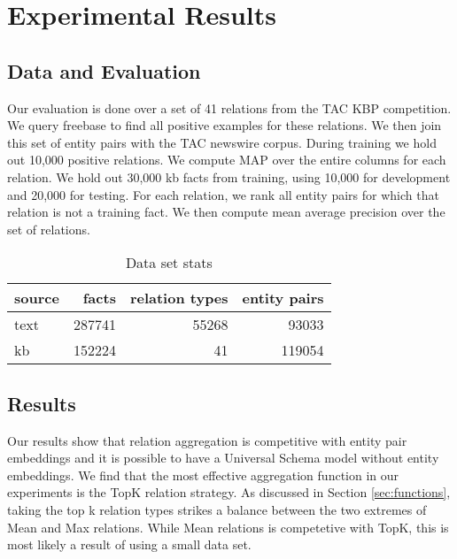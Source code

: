 \section{Experimental Results\label{sec:results}}

\subsection{Data and Evaluation}

Our evaluation is done over a set of 41 relations from the TAC KBP competition.
We query freebase to find all positive examples for these relations.
We then join this set of entity pairs with the TAC newswire corpus.
During training we hold out 10,000 positive relations.
We compute MAP over the entire columns for each relation.
We hold out 30,000 kb facts from training, using 10,000 for development and 20,000 for testing.
For each relation, we rank all entity pairs for which that relation is not a training fact.
We then compute mean average precision over the set of relations.


\begin{table}[h!]
\setlength{\tabcolsep}{4.1pt}
\begin{center}
\begin{tabular}{|l|r|r|r|}
\hline
\bf source & facts & relation types & entity pairs \\
\hline\hline
text & 287741 & 55268 & 93033  \\
\hline
kb & 152224 & 41 & 119054 \\
\hline

\hline
\end{tabular}
\caption{Data set stats
\label{data stats}}
\end{center}
\vspace{-.3cm}
\end{table}


\subsection {Results}
Our results show that relation aggregation is competitive with entity pair embeddings and it is possible to have a Universal Schema model without entity embeddings.
We find that the most effective aggregation function in our experiments is the TopK relation strategy.
As discussed in Section \ref{sec:functions}, taking the top k relation types strikes a balance between the two extremes of Mean and Max relations.
While Mean relations is competetive with TopK, this is most likely a result of using a small data set.


